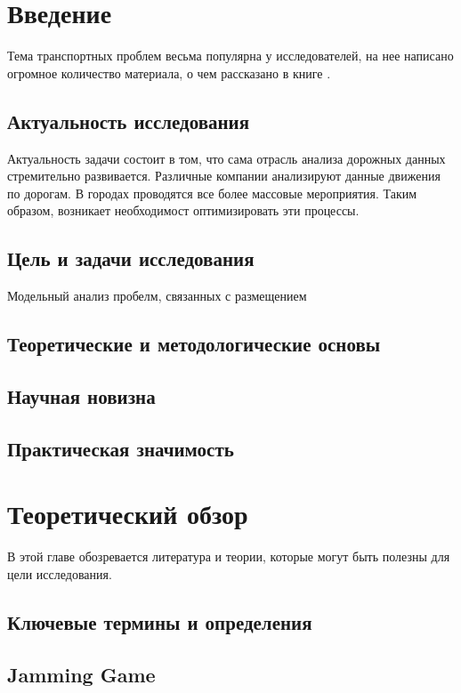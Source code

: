 \chapter{Введение}

Тема транспортных проблем весьма популярна у исследователей, на нее написано огромное количество материала, о чем рассказано в книге \cite{gas}.

\section{Актуальность исследования}

Актуальность задачи состоит в том, что сама отрасль анализа дорожных данных стремительно развивается. Различные компании анализируют данные движения по дорогам. В городах проводятся все более массовые мероприятия. Таким образом, возникает необходимост оптимизировать эти процессы.

\section{Цель и задачи исследования}
Модельный анализ пробелм, связанных с размещением

\section{Теоретические и методологические основы}
\section{Научная новизна}
\section{Практическая значимость}


\chapter{Теоретический обзор}
В этой главе обозревается литература и теории, которые могут быть полезны для цели исследования.
\section{Ключевые термины и определения}


\section{Jamming Game\cite[251]{Association:2018aa}}


